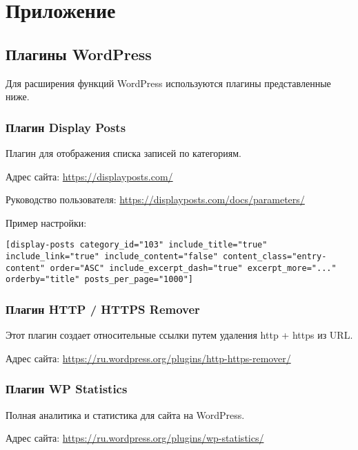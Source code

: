 \chapter{Приложение}
\label{appendix:appendix}

\section{Плагины WordPress}
\label{sec:wp_plugins}

Для расширения функций WordPress используются плагины представленные ниже.
 
\subsection{Плагин Display Posts}
\label{sec:plugin_displayposts}

Плагин для отображения списка записей по категориям.

Адрес сайта: \url{https://displayposts.com/}

Руководство пользователя: \url{https://displayposts.com/docs/parameters/}

Пример настройки:
\small
\begin{lstlisting}[frame=single, breaklines=true]
[display-posts category_id="103" include_title="true" include_link="true" include_content="false" content_class="entry-content" order="ASC" include_excerpt_dash="true" excerpt_more="..." orderby="title" posts_per_page="1000"] 
\end{lstlisting}
\normalsize


\subsection{Плагин HTTP / HTTPS Remover}
\label{sec:plugin_http_https_remover}

Этот плагин создает относительные ссылки путем удаления http + https из URL.

Адрес сайта: \url{https://ru.wordpress.org/plugins/http-https-remover/}

\subsection{Плагин WP Statistics}
\label{sec:plugin_wp_statistics}

Полная аналитика и статистика для сайта на WordPress.

Адрес сайта: \url{https://ru.wordpress.org/plugins/wp-statistics/}

